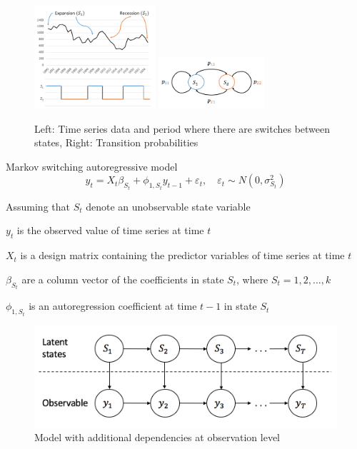 \documentclass{beamer}
\begin{document}
\begin{frame}[fragile]
\begin{figure}
	\includegraphics[width=0.4\textwidth]{msm-ex}
	\hspace{0.1cm}
	\includegraphics[width=0.35\textwidth]{transition1}
	\caption{Left: Time series data and period where there are switches between states, Right: Transition probabilities}
\end{figure}

\end{frame}

\begin{frame}

\begin{block}{Markov switching autoregressive model}
\[
y_{t} = X_{t}\beta_{S_{t}} + \phi_{1,S_{t}} y_{t-1} + \varepsilon_{t}, \quad \varepsilon_{t} \sim N(0,\sigma^{2}_{S_{t}})
\]
\end{block}

Assuming that $S_{t}$ denote an unobservable state variable

$y_{t}$ is the observed value of time series at time $t$ 

$X_{t}$ is a design matrix containing the predictor variables of time series at time $t$ 

$\beta_{S_{t}}$ are a column vector of the coefficients in state $S_{t}$, where $S_{t}=1,2,...,k$

$\phi_{1,S_{t}}$ is an autoregression coefficient at time $t-1$ in state $S_{t}$

\begin{figure}
	\includegraphics[width=0.5\linewidth]{msm-ar1}
	\caption{Model with additional dependencies at observation level}
\end{figure}

\end{frame}
\end{document}
